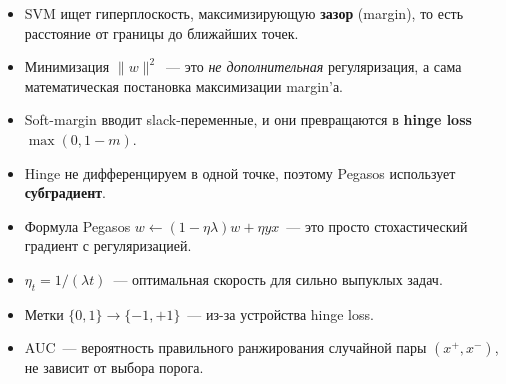 \documentclass[12pt,a4paper]{article}
\begin{document}
\begin{itemize}
  \item SVM ищет гиперплоскость, максимизирующую \textbf{зазор} (margin), то есть расстояние от границы до ближайших точек.
  \item Минимизация $\|w\|^2$~--- это \emph{не дополнительная} регуляризация, а сама математическая постановка максимизации margin'а.
  \item Soft-margin вводит slack-переменные, и они превращаются в \textbf{hinge loss} $\max(0, 1 - m)$.
  \item Hinge не дифференцируем в одной точке, поэтому Pegasos использует \textbf{субградиент}.
  \item Формула Pegasos $w \leftarrow (1 - \eta\lambda)w + \eta y x$~--- это просто стохастический градиент с регуляризацией.
  \item $\eta_t = 1/(\lambda t)$~--- оптимальная скорость для сильно выпуклых задач.
  \item Метки $\{0,1\} \to \{-1,+1\}$~--- из-за устройства hinge loss.
  \item AUC~--- вероятность правильного ранжирования случайной пары $(x^+, x^-)$, не зависит от выбора порога.
\end{itemize}
\end{document}
